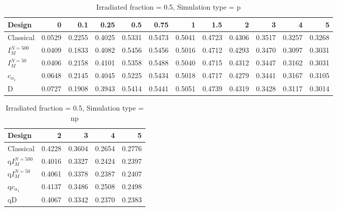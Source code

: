 \documentclass[a4paper]{article}
\begin{document}
\begin{table}[ht]
\centering
\begin{tabular}{lrrrrrrrrrrr}
  \hline
Design & 0 & 0.1 & 0.25 & 0.5 & 0.75 & 1 & 1.5 & 2 & 3 & 4 & 5 \\ 
  \hline
Classical & 0.0529 & 0.2255 & 0.4025 & 0.5331 & 0.5473 & 0.5041 & 0.4723 & 0.4306 & 0.3517 & 0.3257 & 0.3268 \\ 
  $I_M^{N=500}$ & 0.0409 & 0.1833 & 0.4082 & 0.5456 & 0.5456 & 0.5016 & 0.4712 & 0.4293 & 0.3470 & 0.3097 & 0.3031 \\ 
  $I_M^{N=50}$ & 0.0406 & 0.2158 & 0.4101 & 0.5358 & 0.5488 & 0.5040 & 0.4715 & 0.4312 & 0.3447 & 0.3162 & 0.3031 \\ 
  $c_{\alpha_1}$ & 0.0648 & 0.2145 & 0.4045 & 0.5225 & 0.5434 & 0.5018 & 0.4717 & 0.4279 & 0.3441 & 0.3167 & 0.3105 \\ 
  D & 0.0727 & 0.1908 & 0.3943 & 0.5414 & 0.5441 & 0.5051 & 0.4739 & 0.4319 & 0.3428 & 0.3117 & 0.3014 \\ 
   \hline
\end{tabular}
\caption{Irradiated fraction = 0.5, Simulation type = p} 
\end{table}

\begin{table}[ht]
\centering
\begin{tabular}{lrrrr}
  \hline
Design & 2 & 3 & 4 & 5 \\ 
  \hline
Classical & 0.4228 & 0.3604 & 0.2654 & 0.2776 \\ 
  q$I_M^{N=500}$ & 0.4016 & 0.3327 & 0.2424 & 0.2397 \\ 
  q$I_M^{N=50}$ & 0.4061 & 0.3378 & 0.2387 & 0.2407 \\ 
  q$c_{\alpha_1}$ & 0.4137 & 0.3486 & 0.2508 & 0.2498 \\ 
  qD & 0.4067 & 0.3342 & 0.2370 & 0.2383 \\ 
   \hline
\end{tabular}
\caption{Irradiated fraction = 0.5, Simulation type = np} 
\end{table}
\end{document}
